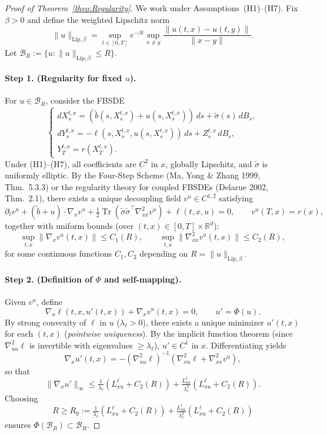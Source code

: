 \documentclass[11pt]{article}
\def\w{\widetilde}
\begin{document}
\begin{proof}[Proof of Theorem~\ref{theo:Regularity}]
We work under Assumptions~(H1)--(H7).  
Fix $\beta>0$ and define the weighted Lipschitz norm
\[
\|u\|_{\mathrm{Lip},\beta}
=\sup_{t\in[0,T]}e^{-\beta t}\sup_{x\neq y}\frac{\|u(t,x)-u(t,y)\|}{\|x-y\|}.
\]
Let $\mathcal{B}_R:=\{u:\|u\|_{\mathrm{Lip},\beta}\le R\}$.

\paragraph{Step 1. (Regularity for fixed $u$).}
For $u\in\mathcal{B}_R$, consider the FBSDE
\[
\begin{cases}
dX_s^{t,x}=(\w b(s,X_s^{t,x})+u(s,X_s^{t,x}))\,ds+\w\sigma(s)\,dB_s,\\[3pt]
dY_s^{t,x}=-\ell(s,X_s^{t,x},u(s,X_s^{t,x}))\,ds+Z_s^{t,x}\,dB_s,\\[3pt]
Y_T^{t,x}=r(X_T^{t,x}).
\end{cases}
\]
Under (H1)--(H7), all coefficients are $C^2$ in $x$, globally Lipschitz, and $\w\sigma$ is uniformly elliptic.  
By the Four-Step Scheme \textnormal{(Ma, Yong \& Zhang 1999, Thm.~5.3.3)} or the regularity theory for coupled FBSDEs \textnormal{(Delarue 2002, Thm.~2.1)}, there exists a unique decoupling field $v^u\in C^{1,2}$ satisfying
\[
\partial_t v^u + (\w b+u)\cdot\nabla_x v^u
+ \tfrac{1}{2}\operatorname{Tr}(\w\sigma\w\sigma^\top\nabla_{xx}^2 v^u)
+ \ell(t,x,u)=0,\qquad v^u(T,x)=r(x),
\]
together with uniform bounds (over $(t,x)\in[0,T]\times\mathbb{R}^d$):
\[
\sup_{t,x}\|\nabla_x v^u(t,x)\|\le C_1(R),\qquad
\sup_{t,x}\|\nabla_{xx}^2 v^u(t,x)\|\le C_2(R),
\]
for some continuous functions $C_1,C_2$ depending on $R=\|u\|_{\mathrm{Lip},\beta}$.

\paragraph{Step 2. (Definition of $\Phi$ and self-mapping).}
Given $v^u$, define
\[
\nabla_u\ell(t,x,u'(t,x))+\nabla_x v^u(t,x)=0,\qquad
u'=\Phi(u).
\]
By strong convexity of $\ell$ in $u$ ($\lambda_\ell>0$), there exists a unique minimizer $u'(t,x)$ for each $(t,x)$ (\emph{pointwise uniqueness}).  
By the implicit function theorem (since $\nabla_{uu}^2\ell$ is invertible with eigenvalues $\ge\lambda_\ell$), $u'\in C^1$ in $x$.  
Differentiating yields
\[
\nabla_x u'(t,x)
=-(\nabla_{uu}^2\ell)^{-1}(\nabla_{xu}^2\ell+\nabla_{xx}^2 v^u),
\]
so that
\[
\|\nabla_x u'\|_\infty
\le\tfrac{1}{\lambda_\ell}(L_{xu}^\ell+C_2(R))
+\tfrac{L_{uu}^\ell}{\lambda_\ell^2}(L_{xu}^\ell+C_2(R)).
\]
Choosing 
\[
R \ge R_0 := 
\tfrac{1}{\lambda_\ell}(L_{xu}^\ell + C_2(R)) 
+ \tfrac{L_{uu}^\ell}{\lambda_\ell^2}(L_{xu}^\ell + C_2(R))
\]
ensures $\Phi(\mathcal{B}_R)\subset\mathcal{B}_R$.


\end{proof}
\end{document}
